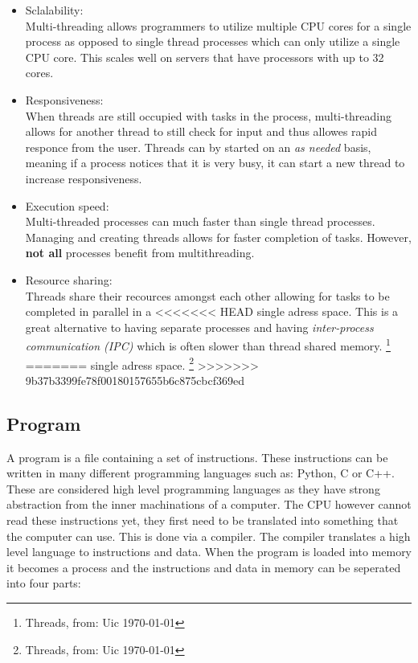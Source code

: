 \begin{itemize}
\item Sclalability: \\

Multi-threading allows programmers to utilize multiple CPU cores for a single process as opposed to single
thread processes which can only utilize a single CPU core. This scales well on servers that have processors
with up to 32 cores.

\item Responsiveness: \\

When threads are still occupied with tasks in the process, multi-threading allows for another thread
to still check for input and thus allowes rapid responce from the user. Threads can by started on an
		\textit{as needed} basis, meaning if a process notices that it is very busy, it can start
		a new thread to increase responsiveness.

\item Execution speed: \\

Multi-threaded processes can much faster than single thread processes. Managing and creating threads allows for
		faster completion of tasks. However, \textbf{not all} processes benefit from multithreading. 

\item Resource sharing: \\

Threads share their recources amongst each other allowing for tasks to be completed in parallel in a
<<<<<<< HEAD
		single adress space. This is a great alternative to having separate processes and having \textit{inter-process communication (IPC)}
		which is often slower than thread shared memory.
		\footnote{Threads, from: Uic \today }
=======
single adress space. \footnote{Threads, from: Uic \today}
>>>>>>> 9b37b3399fe78f00180157655b6c875cbcf369ed

\end{itemize}

\subsection{Program}

A program is a file containing a set of instructions. These instructions can be written in many different 
programming languages such as: Python, C or C++. These are considered high level programming languages as 
they have strong abstraction from the inner machinations of a computer. The CPU however cannot read these 
instructions yet, they first need to be translated into something that the computer can use. This is done 
via a compiler. The compiler translates a high level language to instructions and data. When the program is
loaded into memory it becomes a process and the instructions and data in memory can be seperated into four parts:

